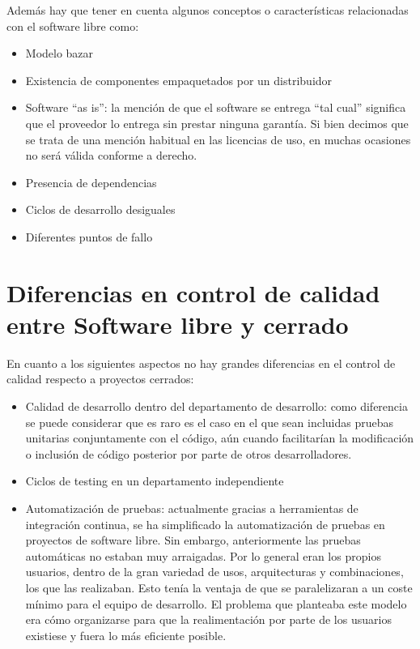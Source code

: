 Además hay que tener en cuenta algunos conceptos o características relacionadas con el software libre como:
\begin{itemize}
     \item Modelo bazar
     \item Existencia de componentes empaquetados por un distribuidor
     \item Software “as is”: la mención de que el software se entrega “tal cual” significa que el proveedor lo entrega sin prestar ninguna garantía. Si bien decimos que se trata de una mención habitual en las licencias de uso, en muchas ocasiones no será válida conforme a derecho.
     \item Presencia de dependencias
     \item Ciclos de desarrollo desiguales
     \item Diferentes puntos de fallo
\end{itemize}

\section{Diferencias en control de calidad entre Software libre y cerrado}

En cuanto a los siguientes aspectos no hay grandes diferencias en el control de calidad respecto a proyectos cerrados:

\begin{itemize}
     \item Calidad de desarrollo dentro del departamento de desarrollo: como diferencia se puede considerar que es raro es el caso en el que sean incluidas pruebas unitarias conjuntamente con el código, aún cuando facilitarían la modificación o inclusión de código posterior por parte de otros desarrolladores.
     \item Ciclos de testing en un departamento independiente
     \item Automatización de pruebas: actualmente gracias a herramientas de integración continua, se ha simplificado la automatización de pruebas en proyectos de software libre. Sin embargo, anteriormente las pruebas automáticas no estaban muy arraigadas. Por lo general eran los propios usuarios, dentro de la gran variedad de usos, arquitecturas y combinaciones, los que las realizaban. Esto tenía la ventaja de que se paralelizaran a un coste mínimo para el equipo de desarrollo. El problema que planteaba este modelo era cómo organizarse para que la realimentación por parte de los usuarios existiese y fuera lo más eficiente posible. 
\end{itemize}

